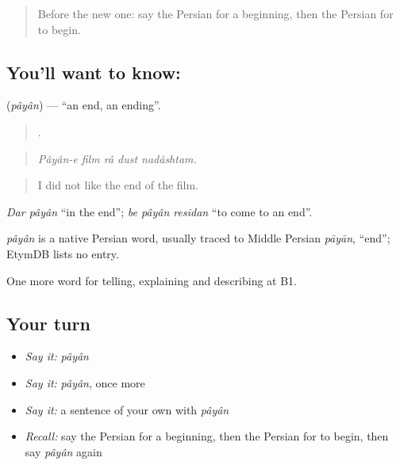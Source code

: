 \label{lesson:FA-C302-payan}



\begin{quote}
Before the new one: say the Persian for a beginning, then the Persian for to begin.
\end{quote}

\subsection*{You'll want to know: }
\textbf{} (\emph{pâyân}) — \textquotedblleft{}an end, an ending\textquotedblright{}.

\begin{quote}
    .
\end{quote}

\begin{quote}
\emph{Pâyân-e film râ dust nadâshtam.}
\end{quote}

\begin{quote}
I did not like the end of the film.
\end{quote}

\emph{Dar pâyân} \textquotedblleft{}in the end\textquotedblright{}; \emph{be pâyân residan} \textquotedblleft{}to come to an end\textquotedblright{}.

\begin{cousinweb}
\emph{pâyân} is a native Persian word, usually traced to Middle Persian \emph{pāyān}, \textquotedblleft{}end\textquotedblright{}; EtymDB lists no entry.
\end{cousinweb}

\begin{grammarlens}[title={What you've built}]
One more word for telling, explaining and describing at B1.
\end{grammarlens}

\subsection*{Your turn}
\begin{itemize}
\raggedright
  \item \emph{Say it:} \emph{pâyân}
  \item \emph{Say it:} \emph{pâyân}, once more
  \item \emph{Say it:} a sentence of your own with \emph{pâyân}
  \item \emph{Recall:} say the Persian for a beginning, then the Persian for to begin, then say \emph{pâyân} again
\end{itemize}

